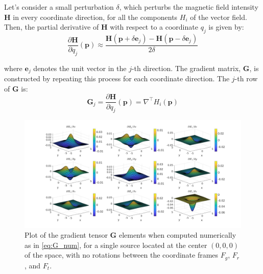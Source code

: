 Let's consider a small perturbation $\delta$, which perturbs the magnetic field intensity $\mathbf{H}$ in every 
coordinate direction, for all the components $H_i$ of the vector field. Then, the partial derivative of $\mathbf{H}$ with 
respect to a coordinate \( q_j \) is given by:
\begin{equation}
\frac{\partial \mathbf{H}}{\partial q_j} (\mathbf{p}) \approx \frac{\mathbf{H}(\mathbf{p} + \delta \mathbf{e}_j) 
- \mathbf{H}(\mathbf{p} - \delta \mathbf{e}_j)}{2\delta}
\label{eq:G_num}
\end{equation}

where \( \mathbf{e}_j \) denotes the unit vector in the \( j \)-th direction. The gradient matrix, 
\( \mathbf{G} \), is constructed by repeating this process for each coordinate direction.
The \( j \)-th row of \( \mathbf{G} \) is:
\begin{equation}
\mathbf{G}_j = \frac{\partial \mathbf{H}}{\partial q_j} (\mathbf{p}) = 
\nabla^\top H_i (\mathbf{p})
\label{eq:G_completa}
\end{equation}

\begin{figure}
\centering
\hspace*{-0.2\textwidth}
\includegraphics[width=1.4\textwidth]{images/gradients_single_num.jpg}
\caption{Plot of the gradient tensor \( \mathbf{G} \) elements
when computed numerically as in \eqref{eq:G_num}, for a single source located
at the center \( (0,0,0) \) of the space, with no rotations between the coordinate
frames \( F_g \), \( F_r \), and \( F_t \).}
\label{fig:gradients_single_num}
\end{figure}

